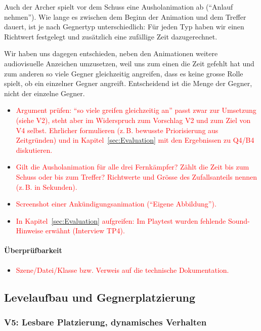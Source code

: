 \documentclass[../Main.tex]{subfiles}
\begin{document}
Auch der Archer spielt vor dem Schuss eine Ausholanimation ab (\enquote{Anlauf nehmen}). Wie lange es zwischen dem Beginn der Animation und dem Treffer dauert, ist je nach Gegnertyp unterschiedlich: Für jeden Typ haben wir einen Richtwert festgelegt und zusätzlich eine zufällige Zeit dazugerechnet.

Wir haben uns dagegen entschieden, neben den Animationen weitere audiovisuelle Anzeichen umzusetzen, weil uns zum einen die Zeit gefehlt hat und zum anderen so viele Gegner gleichzeitig angreifen, dass es keine grosse Rolle spielt, ob ein einzelner Gegner angreift. Entscheidend ist die Menge der Gegner, nicht der einzelne Gegner.

\begin{itemize}[leftmargin=1.5cm]
    \item \textcolor{red}{Argument prüfen: \enquote{so viele greifen gleichzeitig an} passt zwar zur Umsetzung (siehe V2), steht aber im Widerspruch zum Vorschlag V2 und zum Ziel von V4 selbst. Ehrlicher formulieren (z.\,B. bewusste Priorisierung aus Zeitgründen) und in Kapitel~\ref{sec:Evaluation} mit den Ergebnissen zu Q4/B4 diskutieren.}
    \item \textcolor{red}{Gilt die Ausholanimation für alle drei Fernkämpfer? Zählt die Zeit bis zum Schuss oder bis zum Treffer? Richtwerte und Grösse des Zufallsanteils nennen (z.\,B. in Sekunden).}
    \item \textcolor{red}{Screenshot einer Ankündigungsanimation (\enquote{Eigene Abbildung}).}
    \item \textcolor{red}{In Kapitel~\ref{sec:Evaluation} aufgreifen: Im Playtest wurden fehlende Sound-Hinweise erwähnt (Interview TP4).}
\end{itemize}

\paragraph{Überprüfbarkeit}
\begin{itemize}[leftmargin=1.5cm]
    \item \textcolor{red}{Szene/Datei/Klasse bzw. Verweis auf die technische Dokumentation.}
\end{itemize}

\subsection{Levelaufbau und Gegnerplatzierung} \label{sec:UmsetzungLevel}

\subsubsection{V5: Lesbare Platzierung, dynamisches Verhalten} \label{sec:V5}
\end{document}
